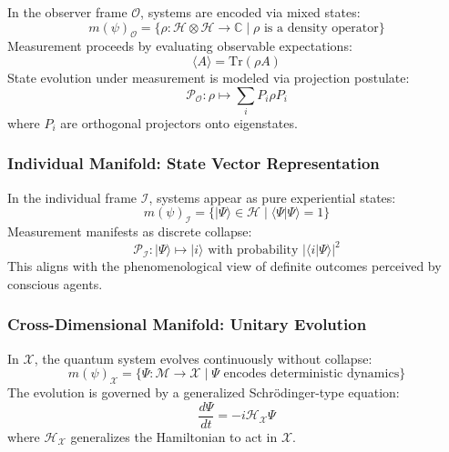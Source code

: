 \documentclass{article}
\begin{document}
In the observer frame $\mathcal{O}$, systems are encoded via mixed states:
\begin{equation}
m(\psi)_{\mathcal{O}} = \{\rho: \mathcal{H} \otimes \mathcal{H} \rightarrow \mathbb{C} \mid \rho \text{ is a density operator} \}
\end{equation}
Measurement proceeds by evaluating observable expectations:
\begin{equation}
\langle A \rangle = \text{Tr}(\rho A)
\end{equation}
State evolution under measurement is modeled via projection postulate:
\begin{equation}
\mathcal{P}_{\mathcal{O}}: \rho \mapsto \sum_i P_i \rho P_i
\end{equation}
where $P_i$ are orthogonal projectors onto eigenstates.

\subsubsection{Individual Manifold: State Vector Representation}

In the individual frame $\mathcal{I}$, systems appear as pure experiential states:
\begin{equation}
m(\psi)_{\mathcal{I}} = \{ |\Psi\rangle \in \mathcal{H} \mid \langle\Psi|\Psi\rangle = 1 \}
\end{equation}
Measurement manifests as discrete collapse:
\begin{equation}
\mathcal{P}_{\mathcal{I}}: |\Psi\rangle \mapsto |i\rangle \text{ with probability } |\langle i|\Psi\rangle|^2
\end{equation}
This aligns with the phenomenological view of definite outcomes perceived by conscious agents.

\subsubsection{Cross-Dimensional Manifold: Unitary Evolution}

In $\mathcal{X}$, the quantum system evolves continuously without collapse:
\begin{equation}
m(\psi)_{\mathcal{X}} = \{ \Psi: \mathcal{M} \rightarrow \mathcal{X} \mid \Psi \text{ encodes deterministic dynamics} \}
\end{equation}
The evolution is governed by a generalized Schr\"odinger-type equation:
\begin{equation}
\frac{d\Psi}{dt} = -i\mathcal{H}_{\mathcal{X}}\Psi
\end{equation}
where $\mathcal{H}_{\mathcal{X}}$ generalizes the Hamiltonian to act in $\mathcal{X}$.
\end{document}
